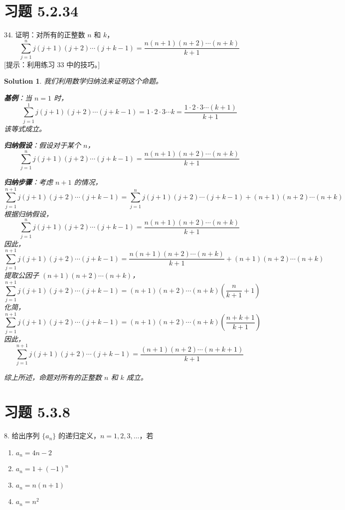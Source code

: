 \documentclass[UTF8]{report}
\newtheorem{solution}{Solution}
\theoremstyle{MyLineTheoremStyle} %
\theoremstyle{MyBlockTheoremStyle} %
\theoremstyle{MySubsubsectionStyle} %
\begin{document}
\section{习题 5.2.34}
34. 证明：对所有的正整数 $n$ 和 $k$，
\[
\sum_{j=1}^{n} j(j+1)(j+2) \cdots (j+k-1) = \frac{n(n+1)(n+2) \cdots (n+k)}{k+1}
\]
[提示：利用练习 33 中的技巧。]

\begin{solution}
    我们利用数学归纳法来证明这个命题。

    \textbf{基例}：当 \( n = 1 \) 时，
    \[
    \sum_{j=1}^{1} j(j+1)(j+2) \cdots (j+k-1) = 1 \cdot 2 \cdot 3 \cdots k = \frac{1 \cdot 2 \cdot 3 \cdots (k+1)}{k+1}
    \]
    该等式成立。

    \textbf{归纳假设}：假设对于某个 \( n \)，
    \[
    \sum_{j=1}^{n} j(j+1)(j+2) \cdots (j+k-1) = \frac{n(n+1)(n+2) \cdots (n+k)}{k+1}
    \]

    \textbf{归纳步骤}：考虑 \( n+1 \) 的情况，
    \[
    \sum_{j=1}^{n+1} j(j+1)(j+2) \cdots (j+k-1) = \sum_{j=1}^{n} j(j+1)(j+2) \cdots (j+k-1) + (n+1)(n+2) \cdots (n+k)
    \]
    根据归纳假设，
    \[
    \sum_{j=1}^{n} j(j+1)(j+2) \cdots (j+k-1) = \frac{n(n+1)(n+2) \cdots (n+k)}{k+1}
    \]
    因此，
    \[
    \sum_{j=1}^{n+1} j(j+1)(j+2) \cdots (j+k-1) = \frac{n(n+1)(n+2) \cdots (n+k)}{k+1} + (n+1)(n+2) \cdots (n+k)
    \]
    提取公因子 \( (n+1)(n+2) \cdots (n+k) \)，
    \[
    \sum_{j=1}^{n+1} j(j+1)(j+2) \cdots (j+k-1) = (n+1)(n+2) \cdots (n+k) \left( \frac{n}{k+1} + 1 \right)
    \]
    化简，
    \[
    \sum_{j=1}^{n+1} j(j+1)(j+2) \cdots (j+k-1) = (n+1)(n+2) \cdots (n+k) \left( \frac{n+k+1}{k+1} \right)
    \]
    因此，
    \[
    \sum_{j=1}^{n+1} j(j+1)(j+2) \cdots (j+k-1) = \frac{(n+1)(n+2) \cdots (n+k+1)}{k+1}
    \]

    综上所述，命题对所有的正整数 \( n \) 和 \( k \) 成立。
\end{solution}

\section{习题 5.3.8}
8. 给出序列 $\{a_n\}$ 的递归定义，$n=1,2,3,\ldots$，若
\begin{enumerate}
    \item $a_n = 4n-2$
    \item $a_n = 1 + (-1)^n$
    \item $a_n = n(n+1)$
    \item $a_n = n^2$
\end{enumerate}
\end{document}

